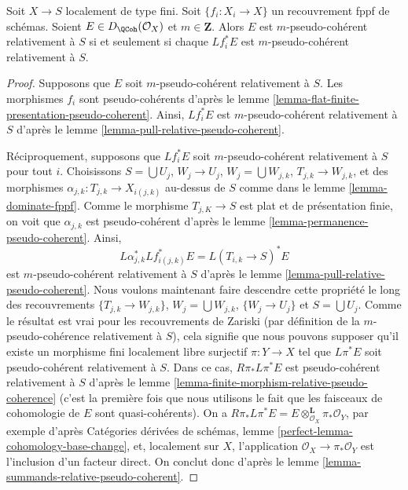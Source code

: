 \begin{lemma}
\label{lemma-relative-pseudo-coherent-descends-fppf}
Soit $X \to S$ localement de type fini.
Soit $\{f_i : X_i \to X\}$ un recouvrement fppf de schémas.
Soient $E \in D_\QCoh(\mathcal{O}_X)$ et $m \in \mathbf{Z}$.
Alors $E$ est $m$-pseudo-cohérent relativement à $S$
si et seulement si chaque $Lf_i^*E$ est $m$-pseudo-cohérent relativement à $S$.
\end{lemma}

\begin{proof}
Supposons que $E$ soit $m$-pseudo-cohérent relativement à $S$.
Les morphismes $f_i$ sont pseudo-cohérents d'après le
lemme \ref{lemma-flat-finite-presentation-pseudo-coherent}.
Ainsi, $Lf_i^*E$ est $m$-pseudo-cohérent relativement à $S$
d'après le lemme \ref{lemma-pull-relative-pseudo-coherent}.

\medskip\noindent
Réciproquement, supposons que $Lf_i^*E$ soit $m$-pseudo-cohérent relativement à $S$
pour tout $i$. Choisissons $S = \bigcup U_j$, $W_j \to U_j$,
$W_j = \bigcup W_{j, k}$, $T_{j, k} \to W_{j, k}$, et des
morphismes $\alpha_{j, k} : T_{j, k} \to X_{i(j, k)}$ au-dessus de $S$ comme dans le
lemme \ref{lemma-dominate-fppf}.
Comme le morphisme $T_{j, K} \to S$ est plat et de présentation finie,
on voit que $\alpha_{j, k}$ est pseudo-cohérent d'après le
lemme \ref{lemma-permanence-pseudo-coherent}.
Ainsi,
$$
L\alpha_{j, k}^*Lf_{i(j, k)}^*E = L(T_{i, k} \to S)^*E
$$
est $m$-pseudo-cohérent relativement à $S$ d'après le
lemme \ref{lemma-pull-relative-pseudo-coherent}.
Nous voulons maintenant faire descendre cette propriété
le long des recouvrements $\{T_{j, k} \to W_{j, k}\}$,
$W_j = \bigcup W_{j, k}$, $\{W_j \to U_j\}$ et $S = \bigcup U_j$.
Comme le résultat est vrai pour les recouvrements de Zariski
(par définition de la $m$-pseudo-cohérence relativement à $S$),
cela signifie que nous pouvons supposer qu'il existe un morphisme
fini localement libre surjectif $\pi : Y \to X$
tel que $L\pi^*E$ soit pseudo-cohérent relativement à $S$.
Dans ce cas, $R\pi_*L\pi^*E$ est pseudo-cohérent relativement à $S$
d'après le lemme \ref{lemma-finite-morphism-relative-pseudo-coherence}
(c'est la première fois que nous utilisons le fait que les faisceaux de cohomologie de $E$ sont quasi-cohérents).
On a
$R\pi_*L\pi^*E = E \otimes^\mathbf{L}_{\mathcal{O}_X} \pi_*\mathcal{O}_Y$,
par exemple d'après
Catégories dérivées de schémas, lemme
\ref{perfect-lemma-cohomology-base-change},
et, localement sur $X$, l'application $\mathcal{O}_X \to \pi_*\mathcal{O}_Y$
est l'inclusion d'un facteur direct. On conclut donc d'après le
lemme \ref{lemma-summands-relative-pseudo-coherent}.
\end{proof}

